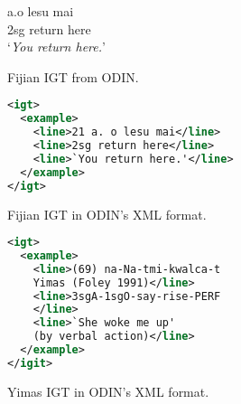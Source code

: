 \begin{figure}[t]
 a.\quad o lesu mai \\
\indent \qquad\qquad 2sg return here \\
\indent \qquad\qquad `\emph{You return here.}' \\
\caption{Fijian IGT from ODIN.} \label{fig:odin_fijian}
\end{figure}


\begin{figure}[t]
\small
\begin{lstlisting}[language=XML]
<igt>
  <example>
    <line>21 a. o lesu mai</line>
    <line>2sg return here</line>
    <line>`You return here.'</line>
  </example>
</igt>
\end{lstlisting} 
\caption{Fijian IGT in ODIN's XML format.} \label{fig:odin_fijian_xml}
\end{figure}




\begin{figure}[t]
\small
\begin{lstlisting}[language=XML]
<igt>
  <example>
    <line>(69) na-Na-tmi-kwalca-t 
    Yimas (Foley 1991)</line>
    <line>3sgA-1sgO-say-rise-PERF
    </line>
    <line>`She woke me up' 
    (by verbal action)</line>
  </example>
</igit>
\end{lstlisting} 
\smallskip
\caption{Yimas IGT in ODIN's XML format.}\label{fig:odin_yimas_xml}
\end{figure}




